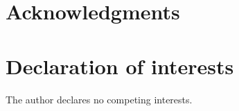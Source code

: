 \documentclass[11pt]{article}
\begin{document}
\section*{Acknowledgments}

\section*{Declaration of interests}
The author declares no competing interests.



\end{document}
